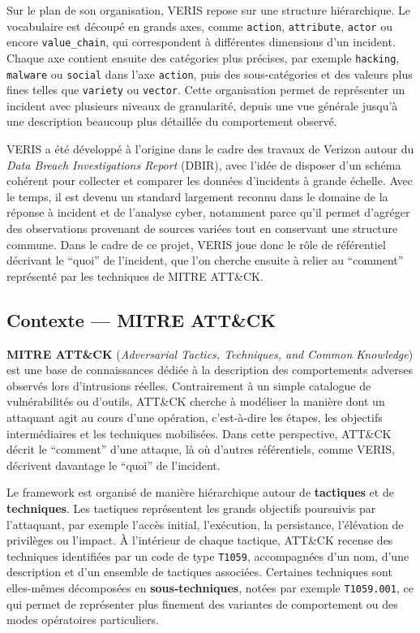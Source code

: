 \documentclass[a4paper,12pt]{article}
\begin{document}
Sur le plan de son organisation, VERIS repose sur une structure hiérarchique. Le vocabulaire est découpé en grands axes, comme \texttt{action}, \texttt{attribute}, \texttt{actor} ou encore \texttt{value\_chain}, qui correspondent à différentes dimensions d'un incident. Chaque axe contient ensuite des catégories plus précises, par exemple \texttt{hacking}, \texttt{malware} ou \texttt{social} dans l'axe \texttt{action}, puis des sous-catégories et des valeurs plus fines telles que \texttt{variety} ou \texttt{vector}. Cette organisation permet de représenter un incident avec plusieurs niveaux de granularité, depuis une vue générale jusqu'à une description beaucoup plus détaillée du comportement observé.

VERIS a été développé à l'origine dans le cadre des travaux de Verizon autour du \emph{Data Breach Investigations Report} (DBIR), avec l'idée de disposer d'un schéma cohérent pour collecter et comparer les données d'incidents à grande échelle. Avec le temps, il est devenu un standard largement reconnu dans le domaine de la réponse à incident et de l'analyse cyber, notamment parce qu'il permet d'agréger des observations provenant de sources variées tout en conservant une structure commune. Dans le cadre de ce projet, VERIS joue donc le rôle de référentiel décrivant le ``quoi'' de l'incident, que l'on cherche ensuite à relier au ``comment'' représenté par les techniques de MITRE ATT\&CK.

\subsection{Contexte --- MITRE ATT\&CK}

\textbf{MITRE ATT\&CK} (\emph{Adversarial Tactics, Techniques, and Common Knowledge}) est une base de connaissances dédiée à la description des comportements adverses observés lors d'intrusions réelles. Contrairement à un simple catalogue de vulnérabilités ou d'outils, ATT\&CK cherche à modéliser la manière dont un attaquant agit au cours d'une opération, c'est-à-dire les étapes, les objectifs intermédiaires et les techniques mobilisées. Dans cette perspective, ATT\&CK décrit le ``comment'' d'une attaque, là où d'autres référentiels, comme VERIS, décrivent davantage le ``quoi'' de l'incident.

Le framework est organisé de manière hiérarchique autour de \textbf{tactiques} et de \textbf{techniques}. Les tactiques représentent les grands objectifs poursuivis par l'attaquant, par exemple l'accès initial, l'exécution, la persistance, l'élévation de privilèges ou l'impact. À l'intérieur de chaque tactique, ATT\&CK recense des techniques identifiées par un code de type \texttt{T1059}, accompagnées d'un nom, d'une description et d'un ensemble de tactiques associées. Certaines techniques sont elles-mêmes décomposées en \textbf{sous-techniques}, notées par exemple \texttt{T1059.001}, ce qui permet de représenter plus finement des variantes de comportement ou des modes opératoires particuliers.
\end{document}
